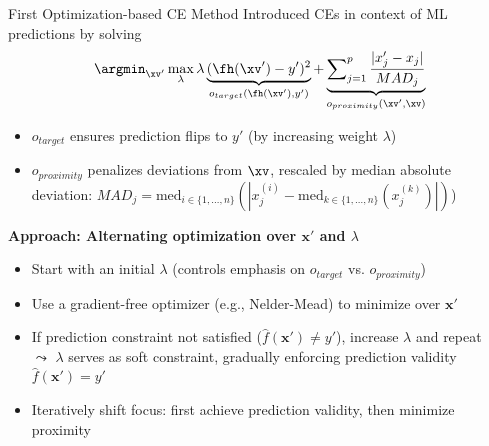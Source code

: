 \documentclass[11pt,compress,t,notes=noshow, aspectratio=169, xcolor=table]{beamer}
\begin{document}
\begin{frame}{First Optimization-based CE Method }
Introduced CEs in context of ML predictions by solving
		$$
			\argmin_{\xv'} \max_{\lambda} \lambda \underbrace{(\fh(\xv') - y')^2}_{o_{target}(\fh(\xv'), y')} + \underbrace{\sum\nolimits_{j = 1}^p \frac{|x'_j - x_j|}{MAD_j}}_{o_{proximity}(\xv', \xv)}
		$$
\begin{itemize}
\item $o_{target}$ ensures prediction flips to $y'$ (by increasing weight $\lambda$)
\item $o_{proximity}$ penalizes deviations from $\xv$, rescaled by median absolute deviation: $MAD_j = \text{med}_{i \in \{1, \dots, n\}} ( | x^{(i)}_j - \text{med}_{k\in \{1, \dots, n\}} (x^{(k)}_j) | )$)
\end{itemize}

\lz
\pause

\textbf{Approach: Alternating optimization over \(\mathbf{x}'\) and \(\lambda\)}

\begin{itemize}
  \item Start with an initial \(\lambda\) (controls emphasis on $o_{target}$ vs. $o_{proximity}$)
  \item Use a gradient-free optimizer (e.g., Nelder-Mead) to minimize over \(\mathbf{x}'\)
  \item If prediction constraint not satisfied (\(\hat{f}(\mathbf{x}') \ne y'\)), increase \(\lambda\) and repeat
  \\
  $\leadsto$ \(\lambda\) serves as soft constraint, gradually enforcing prediction validity \(\hat{f}(\mathbf{x}') = y'\)
  \item Iteratively shift focus: first achieve prediction validity, then minimize proximity%
\end{itemize}



\end{frame}
\end{document}
